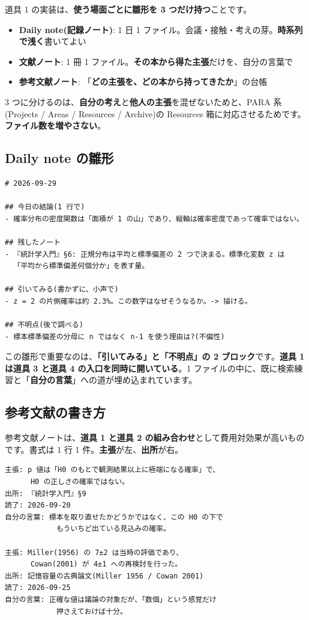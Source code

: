 \documentclass{article}
\begin{document}
道具 1 の実装は、\textbf{使う場面ごとに雛形を 3 つだけ持つ}ことです。

\begin{itemize}
\item \textbf{Daily note(記録ノート)}: 1 日 1 ファイル。会議・接触・考えの芽。\textbf{時系列で浅く}書いてよい
\item \textbf{文献ノート}: 1 冊 1 ファイル。\textbf{その本から得た主張}だけを、自分の言葉で
\item \textbf{参考文献ノート}: 「\textbf{どの主張を、どの本から持ってきたか}」の台帳
\end{itemize}

3 つに分けるのは、\textbf{自分の考え}と\textbf{他人の主張}を混ぜないためと、PARA 系(Projects / Areas / Resources / Archive)の Resources 箱に対応させるためです。\textbf{ファイル数を増やさない}。

\subsection{Daily note の雛形}

\begin{lstlisting}[language=Text]
# 2026-09-29

## 今日の結論(1 行で)
- 確率分布の密度関数は「面積が 1 の山」であり、縦軸は確率密度であって確率ではない。

## 残したノート
- 『統計学入門』§6: 正規分布は平均と標準偏差の 2 つで決まる。標準化変数 z は
  「平均から標準偏差何個分か」を表す量。

## 引いてみる(書かずに、小声で)
- z = 2 の片側確率は約 2.3%。この数字はなぜそうなるか。-> 描ける。

## 不明点(後で調べる)
- 標本標準偏差の分母に n ではなく n-1 を使う理由は?(不偏性)
\end{lstlisting}

この雛形で重要なのは、\textbf{「引いてみる」と「不明点」の 2 ブロック}です。\textbf{道具 1 は道具 3 と道具 4 の入口を同時に開いている}。1 ファイルの中に、既に検索練習と「\textbf{自分の言葉}」への道が埋め込まれています。

\subsection{参考文献の書き方}

参考文献ノートは、\textbf{道具 1 と道具 2 の組み合わせ}として費用対効果が高いものです。書式は 1 行 1 件。\textbf{主張}が左、\textbf{出所}が右。

\begin{lstlisting}[language=Text]
主張: p 値は「H0 のもとで観測結果以上に極端になる確率」で、
      H0 の正しさの確率ではない。
出所: 『統計学入門』§9
読了: 2026-09-20
自分の言葉: 標本を取り直せたかどうかではなく、この H0 の下で
            もういちど出ている見込みの確率。

主張: Miller(1956) の 7±2 は当時の評価であり、
      Cowan(2001) が 4±1 への再検討を行った。
出所: 記憶容量の古典論文(Miller 1956 / Cowan 2001)
読了: 2026-09-25
自分の言葉: 正確な値は議論の対象だが、「数個」という感覚だけ
            押さえておけば十分。
\end{lstlisting}
\end{document}

